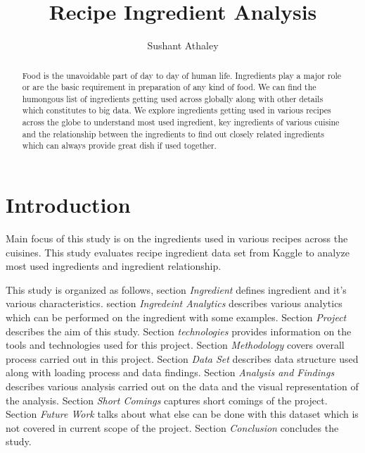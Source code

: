 \documentclass[sigconf]{acmart}
\begin{document}
\title{Recipe Ingredient Analysis}


\author{Sushant Athaley}

\renewcommand{\shortauthors}{G. v. Laszewski}


\begin{abstract}
Food is the unavoidable part of day to day of human life. Ingredients play a major role or are the basic requirement in preparation of any kind of food. We can find the humongous list of ingredients getting used across globally along with other details which constitutes to big data. We explore ingredients getting used in various recipes across the globe to understand most used ingredient, key ingredients of various cuisine and the relationship between the ingredients to find out closely related ingredients which can always provide great dish if used together.
\end{abstract}


\maketitle

\section{Introduction}


Main focus of this study is on the ingredients used in various recipes across the cuisines. This study evaluates recipe ingredient data set from Kaggle \cite{www-kaggle} to analyze most used ingredients and ingredient relationship.

This study is organized as follows, section \emph{Ingredient} defines ingredient and it's various characteristics. section \emph{Ingredeint Analytics} describes various analytics which can be performed on the ingredient with some examples. Section \emph{Project} describes the aim of this study. Section \emph{technologies} provides information on the tools and technologies used for this project. Section \emph{Methodology} covers overall process carried out in this project. Section \emph{Data Set} describes data structure used along with loading process and data findings. Section \emph{Analysis and Findings} describes various analysis carried out on the data and the visual representation of the analysis. Section \emph{Short Comings} captures short comings of the project. Section \emph{Future Work} talks about what else can be done with this dataset which is not covered in current scope of the project. Section \emph{Conclusion} concludes the study.  
\end{document}
